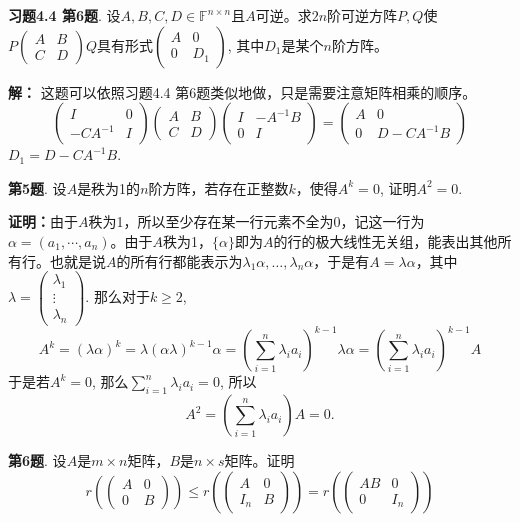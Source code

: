 \newpageorvspace

{\bf 习题4.4 第6题}. 设$A,B,C,D\in\mathbb{F}^{n\times n}$且$A$可逆。求$2n$阶可逆方阵$P,Q$使$P\begin{pmatrix} A & B \\ C & D \end{pmatrix}Q$具有形式$\begin{pmatrix} A & 0 \\ 0 & D_1 \end{pmatrix}$, 其中$D_1$是某个$n$阶方阵。

{\bf 解：} 这题可以依照习题4.4 第6题类似地做，只是需要注意矩阵相乘的顺序。
$$\begin{pmatrix} I & 0 \\ -CA^{-1} & I \end{pmatrix} \begin{pmatrix} A & B \\ C & D \end{pmatrix} \begin{pmatrix} I & -A^{-1}B \\ 0 & I \end{pmatrix} = \begin{pmatrix} A & 0 \\ 0 & D - CA^{-1}B \end{pmatrix}$$
$D_1 = D - CA^{-1}B$.

\newpageorvspace

{\bf 第5题}. 设$A$是秩为1的$n$阶方阵，若存在正整数$k$，使得$A^k = 0$, 证明$A^2 = 0$.

{\bf 证明：}由于$A$秩为1，所以至少存在某一行元素不全为0，记这一行为$\alpha = (a_1, \cdots, a_n)$。由于$A$秩为1，$\{\alpha\}$即为$A$的行的极大线性无关组，能表出其他所有行。也就是说$A$的所有行都能表示为$\lambda_1\alpha, \ldots, \lambda_n\alpha$，于是有$A = \lambda \alpha$，其中$\lambda = \begin{pmatrix}
\lambda_1 \\ \vdots \\ \lambda_n \end{pmatrix}$. 那么对于$k\geqslant 2$,
$$A^k = (\lambda\alpha)^k = \lambda (\alpha\lambda)^{k-1} \alpha = \left( \sum_{i=1}^n \lambda_i a_i \right)^{k-1} \lambda \alpha = \left( \sum_{i=1}^n \lambda_i a_i \right)^{k-1} A$$
于是若$A^k = 0$, 那么$\sum\limits_{i=1}^n \lambda_i a_i = 0$, 所以
$$A^2 = \left( \sum_{i=1}^n \lambda_i a_i \right) A = 0.$$

\newpageorvspace

{\bf 第6题}. 设$A$是$m\times n$矩阵，$B$是$n\times s$矩阵。证明
$$r(\begin{pmatrix} A & 0 \\ 0 & B \end{pmatrix}) \leqslant r(\begin{pmatrix} A & 0 \\ I_n & B \end{pmatrix}) = r(\begin{pmatrix} AB & 0 \\ 0 & I_n \end{pmatrix})$$

